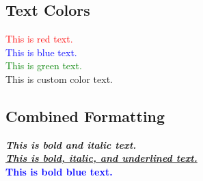 \subsection{Text Colors}

\textcolor{red}{This is red text.}\\
\textcolor{blue}{This is blue text.}\\
\textcolor{green}{This is green text.}\\
\textcolor{codehighlight}{This is custom color text.}

\subsection{Combined Formatting}

\textbf{\textit{This is bold and italic text.}}\\
\underline{\textbf{\textit{This is bold, italic, and underlined text.}}}\\
\textcolor{blue}{\textbf{This is bold blue text.}}